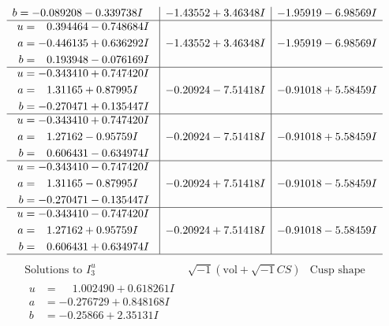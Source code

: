 \documentclass[1p]{elsarticle_modified}
\theoremstyle{definition}
\newcommand{\I}{\sqrt{-1}}
\begin{document}
$$\begin{array}{c|c|c}
\begin{aligned}
b &= -0.089208 - 0.339738 I\end{aligned}
 & -1.43552 + 3.46348 I & -1.95919 - 6.98569 I \\ \hline\begin{aligned}
u &= \phantom{-}0.394464 - 0.748684 I \\
a &= -0.446135 + 0.636292 I \\
b &= \phantom{-}0.193948 - 0.076169 I\end{aligned}
 & -1.43552 + 3.46348 I & -1.95919 - 6.98569 I \\ \hline\begin{aligned}
u &= -0.343410 + 0.747420 I \\
a &= \phantom{-}1.31165 + 0.87995 I \\
b &= -0.270471 + 0.135447 I\end{aligned}
 & -0.20924 - 7.51418 I & -0.91018 + 5.58459 I \\ \hline\begin{aligned}
u &= -0.343410 + 0.747420 I \\
a &= \phantom{-}1.27162 - 0.95759 I \\
b &= \phantom{-}0.606431 - 0.634974 I\end{aligned}
 & -0.20924 - 7.51418 I & -0.91018 + 5.58459 I \\ \hline\begin{aligned}
u &= -0.343410 - 0.747420 I \\
a &= \phantom{-}1.31165 - 0.87995 I \\
b &= -0.270471 - 0.135447 I\end{aligned}
 & -0.20924 + 7.51418 I & -0.91018 - 5.58459 I \\ \hline\begin{aligned}
u &= -0.343410 - 0.747420 I \\
a &= \phantom{-}1.27162 + 0.95759 I \\
b &= \phantom{-}0.606431 + 0.634974 I\end{aligned}
 & -0.20924 + 7.51418 I & -0.91018 - 5.58459 I\\
 \hline 
 \end{array}$$\newpage$$\begin{array}{c|c|c}  
\text{Solutions to }I^u_{3}& \I (\text{vol} + \sqrt{-1}CS) & \text{Cusp shape}\\
 \hline 
\begin{aligned}
u &= \phantom{-}1.002490 + 0.618261 I \\
a &= -0.276729 + 0.848168 I \\
b &= -0.25866 + 2.35131 I\end{aligned}

\end{array}$$
\end{document}
